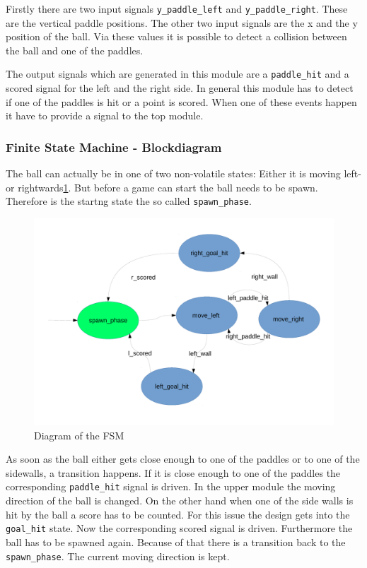 Firstly there are two input signals \texttt{y\_paddle\_left} and \texttt{y\_paddle\_right}. These are the vertical paddle positions. The other two input signals are the x and the y position of the ball. Via these values it is possible to detect a collision between the ball and one of the paddles.\newline 

The output signals which are generated in this module are a \texttt{paddle\_hit} and a scored signal for the left and the right side. In general this module has to detect if one of the paddles is hit or a point is scored. When one of these events happen it have to provide a signal to the top module.


\subsubsection{Finite State Machine - Blockdiagram}

The ball can actually be in one of two non-volatile states: Either it is moving left- or rightwards\ref{fsm}. But before a game can start the ball needs to be spawn. Therefore is the startng state the so called \texttt{spawn\_phase}.
\begin{figure}[h]
    \centering
	\includegraphics[scale=0.4]{images/state_machine.pdf}

\caption{Diagram of the FSM}
\label{fsm}
\end{figure}
As soon as the ball either gets close enough to one of the paddles or to one of the sidewalls, a transition happens. If it is close enough to one of the paddles the corresponding \texttt{paddle\_hit} signal is driven. In the upper module the moving direction of the ball is changed. On the other hand when one of the side walls is hit by the ball a score has to be counted. For this issue the design gets into the \texttt{goal\_hit} state. Now the corresponding scored signal is driven. Furthermore the ball has to be spawned again. Because of that there is a transition back to the \texttt{spawn\_phase}. The current moving direction is kept.


